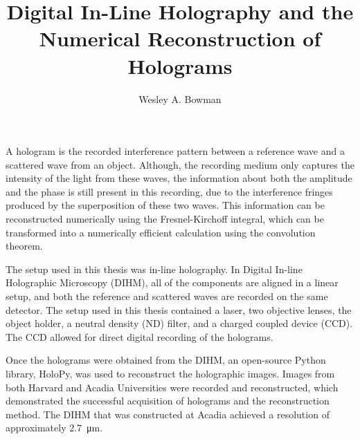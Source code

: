 

\title{Digital In-Line Holography and the Numerical Reconstruction of Holograms}
\author{Wesley A. Bowman}
\tablespagefalse

\beforepreface
{}

    A hologram is the recorded interference pattern between a reference
    wave and a scattered wave from an object. Although, the recording medium only
    captures
    the intensity of the light from these waves, the information about both
    the amplitude and the phase is still present in this recording, due to the
    interference fringes produced by the superposition of these two waves.
    This information can be reconstructed numerically using the
    Fresnel-Kirchoff integral, which can be transformed into a
    numerically efficient calculation using the convolution theorem.

    The setup used in this thesis was in-line holography.
    In Digital In-line Holographic Microscopy (DIHM), all of the components 
    are aligned in a linear setup, and 
    both the reference and scattered waves are
    recorded on the same detector. The setup used in this thesis contained a
    laser, two objective lenses, the object holder, a neutral density (ND) filter, and
    a charged coupled device (CCD). The CCD allowed for direct 
    digital recording of the holograms.

    Once the holograms were obtained from the DIHM, an open-source Python
    library, HoloPy, was used to reconstruct the holographic images. Images
    from both Harvard and Acadia Universities were recorded and reconstructed, which
    demonstrated the successful
    acquisition of holograms and the reconstruction method.
    The DIHM that was constructed at Acadia achieved a resolution of approximately
    \SI{2.7}{\micro\meter}.





